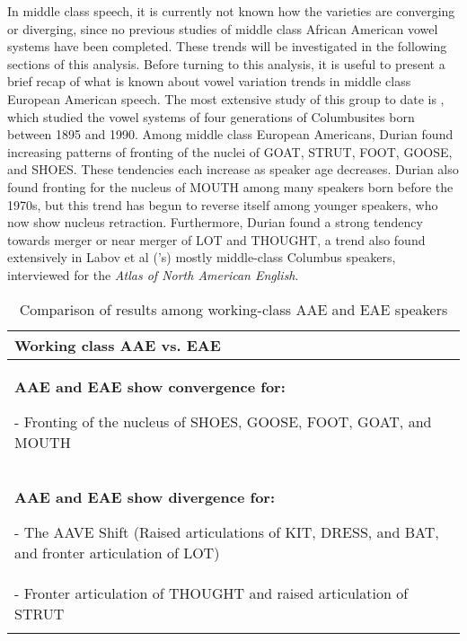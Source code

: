 \documentclass[output=paper,colorlinks,citecolor=brown]{langscibook}
\begin{document}
 In middle class speech, it is currently not known how the varieties are converging or diverging, since no previous studies of middle class African American vowel systems have been completed. These trends will be investigated in the following sections of this analysis. Before turning to this analysis, it is useful to present a brief recap of what is known about vowel variation trends in middle class European American speech. The most extensive study of this group to date is \citet{durian2012new}, which studied the vowel systems of four generations of Columbusites born between 1895 and 1990. Among middle class European Americans, Durian found increasing patterns of fronting of the nuclei of GOAT, STRUT, FOOT, GOOSE, and SHOES. These tendencies each increase as speaker age decreases. Durian also found fronting for the nucleus of MOUTH among many speakers born before the 1970s, but this trend has begun to reverse itself among younger speakers, who now show nucleus retraction. Furthermore, Durian found a strong tendency towards merger or near merger of LOT and THOUGHT, a trend also found extensively in Labov et al  (\citeyear{labov2006atlas}'s) mostly middle-class Columbus speakers, interviewed for the \textit{Atlas of North American English}.

\begin{table}
\begin{tabularx}{\textwidth}{X}
\lsptoprule

\textbf{Working class AAE vs. EAE}\\
\midrule
{\textbf{AAE and EAE show convergence for:}}

- Fronting of the nucleus of SHOES, GOOSE, FOOT, GOAT, and MOUTH\\
\tablevspace

\midrule
{\textbf{AAE and EAE show divergence for:}}

- The AAVE Shift (Raised articulations of KIT, DRESS, and BAT, and fronter articulation of LOT)\\
\tablevspace
- Fronter articulation of THOUGHT and raised articulation of STRUT\\
\lspbottomrule
\end{tabularx}


\caption{Comparison of results among working-class AAE and EAE speakers}
\label{tab:durian:1}
\end{table}
\end{document}
